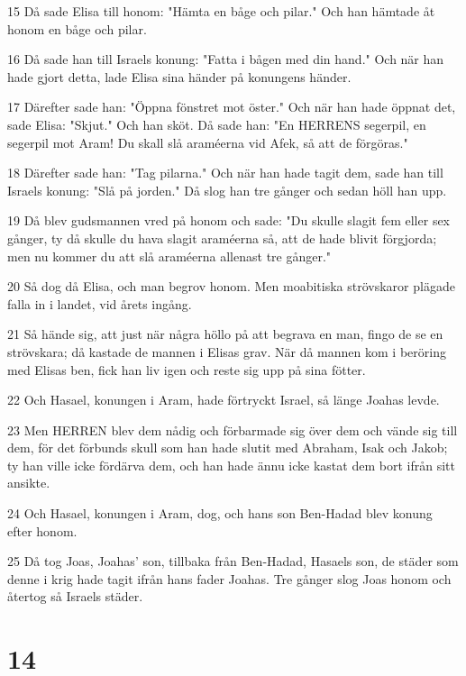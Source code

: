 \par 15 Då sade Elisa till honom: "Hämta en båge och pilar." Och han hämtade åt honom en båge och pilar.
\par 16 Då sade han till Israels konung: "Fatta i bågen med din hand." Och när han hade gjort detta, lade Elisa sina händer på konungens händer.
\par 17 Därefter sade han: "Öppna fönstret mot öster." Och när han hade öppnat det, sade Elisa: "Skjut." Och han sköt. Då sade han: "En HERRENS segerpil, en segerpil mot Aram! Du skall slå araméerna vid Afek, så att de förgöras."
\par 18 Därefter sade han: "Tag pilarna." Och när han hade tagit dem, sade han till Israels konung: "Slå på jorden." Då slog han tre gånger och sedan höll han upp.
\par 19 Då blev gudsmannen vred på honom och sade: "Du skulle slagit fem eller sex gånger, ty då skulle du hava slagit araméerna så, att de hade blivit förgjorda; men nu kommer du att slå araméerna allenast tre gånger."
\par 20 Så dog då Elisa, och man begrov honom. Men moabitiska strövskaror plägade falla in i landet, vid årets ingång.
\par 21 Så hände sig, att just när några höllo på att begrava en man, fingo de se en strövskara; då kastade de mannen i Elisas grav. När då mannen kom i beröring med Elisas ben, fick han liv igen och reste sig upp på sina fötter.
\par 22 Och Hasael, konungen i Aram, hade förtryckt Israel, så länge Joahas levde.
\par 23 Men HERREN blev dem nådig och förbarmade sig över dem och vände sig till dem, för det förbunds skull som han hade slutit med Abraham, Isak och Jakob; ty han ville icke fördärva dem, och han hade ännu icke kastat dem bort ifrån sitt ansikte.
\par 24 Och Hasael, konungen i Aram, dog, och hans son Ben-Hadad blev konung efter honom.
\par 25 Då tog Joas, Joahas' son, tillbaka från Ben-Hadad, Hasaels son, de städer som denne i krig hade tagit ifrån hans fader Joahas. Tre gånger slog Joas honom och återtog så Israels städer.

\chapter{14}

